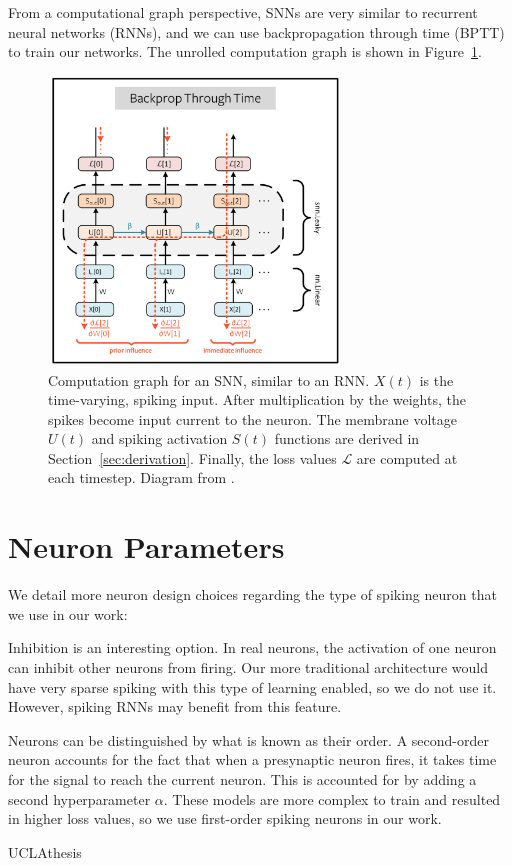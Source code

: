 \documentclass [MS] {UCLAthesis}
\begin{document}
From a computational graph perspective, SNNs are very similar to recurrent neural networks (RNNs), and we can use backpropagation through time (BPTT) to train our networks. The unrolled computation graph is shown in Figure~\ref{fig:snn_loop_unroll}.

\begin{figure}
    \centering
    \includegraphics[width=0.7\textwidth]{snnTorch_bptt}
    \caption[Unrolled computation graph for an SNN]{Computation graph for an SNN, similar to an RNN. $X(t)$ is the time-varying, spiking input. After multiplication by the weights, the spikes become input current to the neuron. The membrane voltage $U(t)$ and spiking activation $S(t)$ functions are derived in Section~\ref{sec:derivation}. Finally, the loss values $\mathcal{L}$ are computed at each timestep. Diagram from \citep{snnTorch}.}
    \label{fig:snn_loop_unroll}
\end{figure}


\section{Neuron Parameters}

We detail more neuron design choices regarding the type of spiking neuron that we use in our work:

Inhibition is an interesting option. In real neurons, the activation of one neuron can inhibit other neurons from firing. Our more traditional architecture would have very sparse spiking with this type of learning enabled, so we do not use it. However, spiking RNNs may benefit from this feature.

Neurons can be distinguished by what is known as their order. A second-order neuron accounts for the fact that when a presynaptic neuron fires, it takes time for the signal to reach the current neuron. This is accounted for by adding a second hyperparameter $\alpha$. These models are more complex to train and resulted in higher loss values, so we use first-order spiking neurons in  our work.


 {UCLAthesis}

\end{document}
